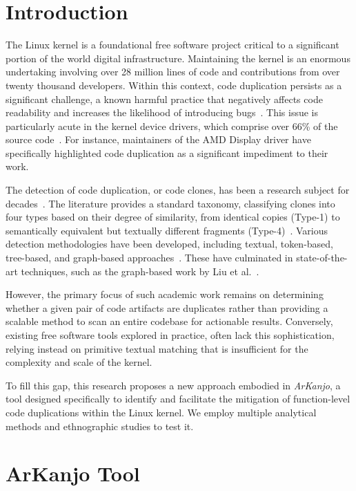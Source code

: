 \documentclass[conference]{IEEEtran}
\begin{document}
\section{Introduction}

The Linux kernel is a foundational free software project 
critical to a significant portion of the world digital infrastructure. Maintaining 
the kernel is an enormous undertaking involving over 28 million lines of code 
and contributions from over twenty thousand developers. Within this context, code 
duplication persists as a significant challenge, a known harmful practice that 
negatively affects code readability and increases the likelihood of introducing
bugs~\cite{harmone,harmtwo}. This issue is particularly acute in the 
kernel device drivers, which comprise over 66\% of the source code~\cite{marcelo}. 
For instance, maintainers of the AMD Display driver have specifically highlighted code 
duplication as a significant impediment to their work.

The detection of code duplication, or code clones, has been a research subject for 
decades~\cite{firstman}. The literature provides a standard taxonomy, classifying 
clones into four types based on their degree of similarity, from identical copies 
(Type-1) to semantically equivalent but textually different fragments (Type-4)~\cite{litreview}. 
Various detection methodologies have been developed, including textual, token-based, 
tree-based, and graph-based approaches~\cite{litreview}. These have culminated in 
state-of-the-art techniques, such as the graph-based work by Liu et al.~\cite{tailor}.

However, the primary focus of such academic work remains on determining whether a given 
pair of code artifacts are duplicates rather than providing a scalable method to scan 
an entire codebase for actionable results. Conversely, existing free software tools explored 
in practice, often lack this sophistication, relying instead on primitive textual matching 
that is insufficient for the complexity and scale of the kernel.

To fill this gap, this research proposes a new approach embodied in \textit{ArKanjo}, a tool 
designed specifically to identify and facilitate the mitigation of function-level code 
duplications within the Linux kernel. We employ multiple analytical 
methods and ethnographic studies to test it.


\section{ArKanjo Tool}
\end{document}
